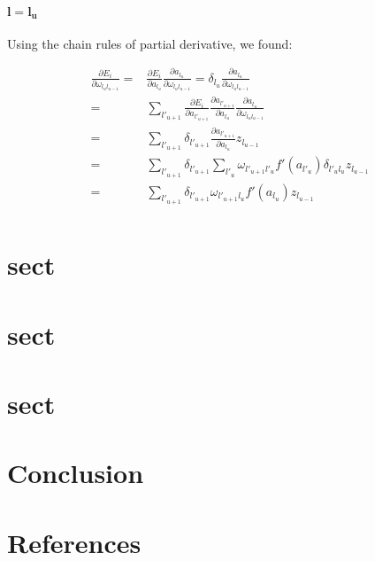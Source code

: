 \documentclass[final, paper=letter,5p,times,twocolumn]{elsarticle}
\begin{document}
\paragraph{$\bm{l = l_{u}}$}{Using the chain rules of partial derivative, we found:

  \begin{equation*}
    \begin{split}
      \frac{\partial E_{i}}{\partial \omega_{l_{u}l_{u-1}}} = &  \frac{\partial E_{i}}{\partial a_{l_{u}}} \frac{\partial a_{l_{u}}}{\partial \omega_{l_{u}l_{u-1}}} = \delta_{l_{u}} \frac{\partial a_{l_{u}}}{\partial \omega_{l_{u}l_{u-1}}}  \\
              = & \sum_{l'_{u+1}}\frac{\partial E_{i}}{\partial a_{l'_{u+1}}} \frac{\partial a_{l'_{u+1}}}{\partial a_{l_{u}}} \frac{\partial a_{l_{u}}}{\partial \omega_{l_{u}l_{u-1}}}   \\
              = & \sum_{l'_{u+1}} \delta_{l'_{u+1}} \frac{\partial a_{l'_{u+1}}}{\partial a_{l_{u}}} z_{l_{u-1}}   \\
              = & \sum_{l'_{u+1}} \delta_{l'_{u+1}} \sum_{l'_{u}} \omega_{l'_{u+1}l'_{u}} f'(a_{l'_{u}}) \delta_{l'_{u}l_{u}} z_{l_{u-1}}   \\
              = & \sum_{l'_{u+1}} \delta_{l'_{u+1}} \omega_{l'_{u+1}l_{u}} f'(a_{l_{u}}) z_{l_{u-1}}   \\
    \end{split}
\end{equation*}

}


\section{sect}

\section{sect}

\section{sect}


\section{Conclusion}

\section*{References}



\end{document}
